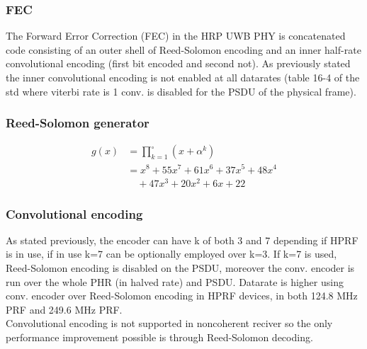 \documentclass[conference]{IEEEtran}
\begin{document}
\subsubsection{FEC}
The Forward Error Correction (FEC) in the HRP UWB PHY is concatenated code consisting of an
outer shell of Reed-Solomon encoding and an inner half-rate convolutional encoding (first bit
encoded and second not). As previously stated the inner convolutional encoding is not enabled
at all datarates (table 16-4 of the std where viterbi rate is 1 conv. is disabled for the PSDU
of the physical frame).\\

\subsubsection{Reed-Solomon generator}
\begin{align*}
  g(x) &= \prod_{k=1}^{\circ} (x + \alpha^k) \\
       &= x^8 + 55x^7 + 61x^6 + 37x^5 + 48x^4 \\
       &\quad + 47x^3 + 20x^2 + 6x + 22
  \end{align*}

\subsubsection{Convolutional encoding}
As stated previously, the encoder can have k of both 3 and 7 depending if HPRF is in use,
if in use k=7 can be optionally employed over k=3. If k=7 is used, Reed-Solomon encoding
is disabled on the PSDU, moreover the conv. encoder is run over the whole PHR (in halved rate) 
and PSDU. Datarate is higher using conv. encoder over Reed-Solomon encoding in HPRF devices, in
both  124.8 MHz PRF and 249.6 MHz PRF.\\ 
Convolutional encoding is not supported in noncoherent reciver so the only performance
improvement possible is through Reed-Solomon decoding.\\


%
%
\end{document}
